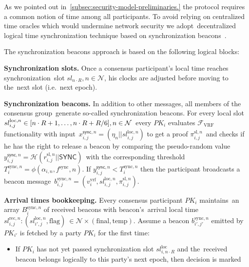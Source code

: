 As we pointed out in~\ref{subsec:security-model-preliminaries.} the protocol requires a common notion of time among all participants.
To avoid relying on centralized time oracles which would undermine network security we adopt\
decentralized logical time synchronization technique based on synchronization beacons~\cite{cryptoeprint:2019/838}.

The synchronization beacons approach is based on the following logical blocks:
\begin{legal}
    \item[]\textbf{Synchronization slots.} Once a consensus participant’s local time reaches synchronization\
    slot ${sl_{n \cdot R}, n \in \mathcal{N}}$, his clocks are adjusted before moving to the\
    next slot (i.e.\ next epoch).
    \item[]\textbf{Synchronization beacons.} In addition to other messages, all members of the consensus group\
    generate so-called synchronization beacons.
    For every local slot $sl_{i, j}^{\text{loc}, n} \in [n \cdot R + 1,\dots,n \cdot R + R \// 6], n \in \mathcal{N}$\
    every $PK_i$ evaluates $\mathcal{F}_{\text{VRF}}$ functionality with input\
    ${x_{i, j}^{\textsf{sync}, n} = (\eta_n || sl_{i, j}^{\text{loc}, n})}$ to get a proof $\pi_{i, j}^{\text{sl}, n}$\
    and checks if he has the right to release a beacon by comparing the pseudo-random value\
    ${y_{i, j}^{\textsf{sync}, n} = \mathcal{H}(r_{i, j}^{\text{sl}, n} || \textsf{SYNC})}$\
    with the corresponding threshold $T_{i}^{\text{sync}, n} = \phi(\alpha_{i, n}, f^{\text{sync}}, n)$.
    If ${y_{i, j}^{\textsf{sync}, n} < T_{i}^{\text{sync}, n}}$ then the participant broadcasts a beacon message\
    $b_{i, j}^{\text{sync}, n} = (v^{\text{vrf}}_i, sl_{i, j}^{\text{loc}, n}, \pi_{i, j}^{\text{sl}, n})$.
    \item[]\textbf{Arrival times bookkeeping.} Every consensus participant $PK_i$ maintains\
    an array $B_i^{\text{sync}, n}$ of received beacons with beacon's\
    arrival local time ${sl^{\text{rec}, n}_{i, j}: (sl_{i', j}^{\text{loc}, n}, \text{flag})\
    \in \mathcal{N} \times (\text{final}, \text{temp})}$.
    Assume a beacon $b_{i', j'}^{\text{sync}, n}$ emitted by $PK_{i'}$ is fetched by a party $PK_i$ for the first time:
    \begin{itemize}
        \item If $PK_i$ has not yet passed synchronization slot $sl_{i, n \cdot R}^{\text{loc}}$ and the\
        received beacon belongs logically to this party’s next epoch, then decision is marked\

\end{itemize}
\end{legal}
